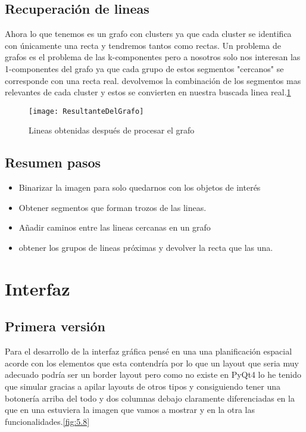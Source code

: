 \subsection{Recuperación de lineas}
Ahora lo que tenemos es un grafo con clusters ya que cada cluster se identifica con únicamente una recta y tendremos tantos como rectas.
Un problema de grafos es el problema de las k-componentes pero a nosotros solo nos interesan las 1-componentes del grafo ya que cada grupo de estos segmentos "cercanos" se corresponde con una recta real.
devolvemos la combinación de los segmentos mas relevantes de cada cluster y estos se convierten en nuestra buscada linea real.\ref{fig:5.7}
\begin{figure}[h]
\centering
\texttt{[image: ResultanteDelGrafo]}
\caption{Lineas obtenidas después de procesar el grafo}
\label{fig:5.7}
\end{figure}

\subsection{Resumen pasos}

\begin{itemize}
\item Binarizar la imagen para solo quedarnos con los objetos de interés
\item Obtener segmentos que forman trozos de las lineas.
\item Añadir caminos entre las lineas cercanas en un grafo
\item obtener los grupos de lineas próximas y devolver la recta que las una. 
\end{itemize}

\section{Interfaz}
\subsection{Primera versión}

Para el desarrollo de la interfaz gráfica pensé en una una planificación espacial acorde con los elementos que esta contendría por lo que un layout que seria muy adecuado podría ser un border layout pero como no existe en PyQt4 lo he tenido que simular gracias a apilar layouts de otros tipos y consiguiendo tener una botonería arriba del todo y dos columnas debajo claramente diferenciadas en la que en una estuviera la imagen que vamos a mostrar y en la otra las funcionalidades.\ref{fig:5.8}

